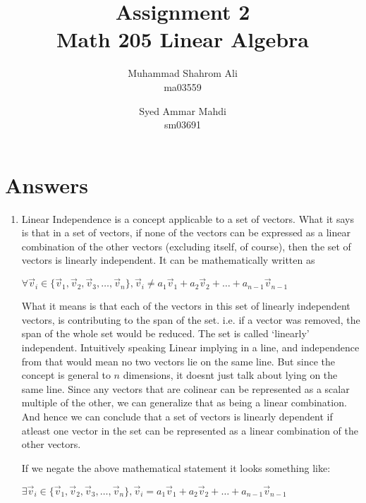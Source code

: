 \documentclass[a4paper, 11pt]{article}
\title{Assignment 2 \\ Math 205 Linear Algebra}
\author{
  Muhammad Shahrom Ali\\ ma03559
  \and
  Syed Ammar Mahdi\\  sm03691
}
\begin{document}
\setlength{\parskip}{10pt} %
\setlength{\parindent}{0pt}
\maketitle




\section{Answers}


\begin{enumerate} 

\item Linear Independence is a concept applicable to a set of vectors. What it says is that in a set of vectors, if none of the vectors can be expressed as a linear combination of the other vectors (excluding itself, of course), then the set of vectors is linearly independent. It can be mathematically written as 

\begin{center}
$\forall \vec v_i \in \{ \vec v_1, \vec v_2, \vec v_3, \dots, \vec v_n \}, \vec v_i \neq a_1 \vec v_1 + a_2 \vec v_2 + \dots + a_{n-1} \vec v_{n-1}$
\end{center}

What it means is that each of the vectors in this set of linearly independent vectors, is contributing to the span of the set. i.e. if a vector was removed, the span of the whole set would be reduced. The set is called `linearly' independent. Intuitively speaking Linear implying in a line, and independence from that would mean no two vectors lie on the same line. But since the concept is general to $n$ dimensions, it doesnt just talk about lying on the same line. Since any vectors that are colinear can be represented as a scalar multiple of the other, we can generalize that as being a linear combination. And hence we can conclude that a set of vectors is linearly dependent if atleast one vector in the set can be represented as a linear combination of the other vectors.

If we negate the above mathematical statement it looks something like:

\begin{center}
$\exists \vec v_i \in \{ \vec v_1, \vec v_2, \vec v_3, \dots, \vec v_n \}, \vec v_i = a_1 \vec v_1 + a_2 \vec v_2 + \dots + a_{n-1} \vec v_{n-1}$


\end{center}
\end{enumerate}
\end{document}

